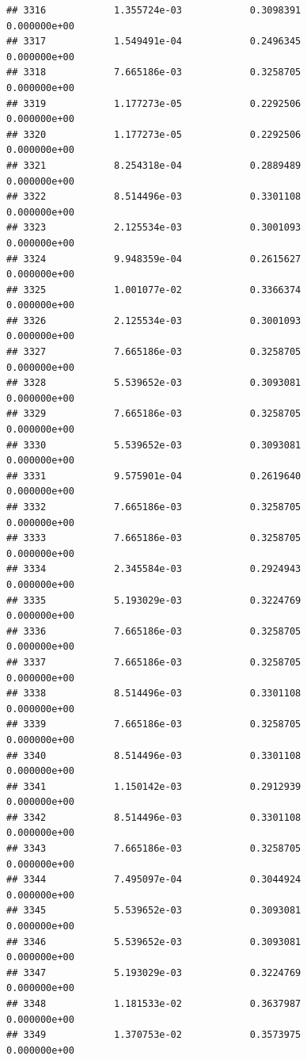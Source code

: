 \documentclass[
]{article}
\begin{document}
\begin{verbatim}
## 3316            1.355724e-03            0.3098391            0.000000e+00
## 3317            1.549491e-04            0.2496345            0.000000e+00
## 3318            7.665186e-03            0.3258705            0.000000e+00
## 3319            1.177273e-05            0.2292506            0.000000e+00
## 3320            1.177273e-05            0.2292506            0.000000e+00
## 3321            8.254318e-04            0.2889489            0.000000e+00
## 3322            8.514496e-03            0.3301108            0.000000e+00
## 3323            2.125534e-03            0.3001093            0.000000e+00
## 3324            9.948359e-04            0.2615627            0.000000e+00
## 3325            1.001077e-02            0.3366374            0.000000e+00
## 3326            2.125534e-03            0.3001093            0.000000e+00
## 3327            7.665186e-03            0.3258705            0.000000e+00
## 3328            5.539652e-03            0.3093081            0.000000e+00
## 3329            7.665186e-03            0.3258705            0.000000e+00
## 3330            5.539652e-03            0.3093081            0.000000e+00
## 3331            9.575901e-04            0.2619640            0.000000e+00
## 3332            7.665186e-03            0.3258705            0.000000e+00
## 3333            7.665186e-03            0.3258705            0.000000e+00
## 3334            2.345584e-03            0.2924943            0.000000e+00
## 3335            5.193029e-03            0.3224769            0.000000e+00
## 3336            7.665186e-03            0.3258705            0.000000e+00
## 3337            7.665186e-03            0.3258705            0.000000e+00
## 3338            8.514496e-03            0.3301108            0.000000e+00
## 3339            7.665186e-03            0.3258705            0.000000e+00
## 3340            8.514496e-03            0.3301108            0.000000e+00
## 3341            1.150142e-03            0.2912939            0.000000e+00
## 3342            8.514496e-03            0.3301108            0.000000e+00
## 3343            7.665186e-03            0.3258705            0.000000e+00
## 3344            7.495097e-04            0.3044924            0.000000e+00
## 3345            5.539652e-03            0.3093081            0.000000e+00
## 3346            5.539652e-03            0.3093081            0.000000e+00
## 3347            5.193029e-03            0.3224769            0.000000e+00
## 3348            1.181533e-02            0.3637987            0.000000e+00
## 3349            1.370753e-02            0.3573975            0.000000e+00

\end{verbatim}
\end{document}
